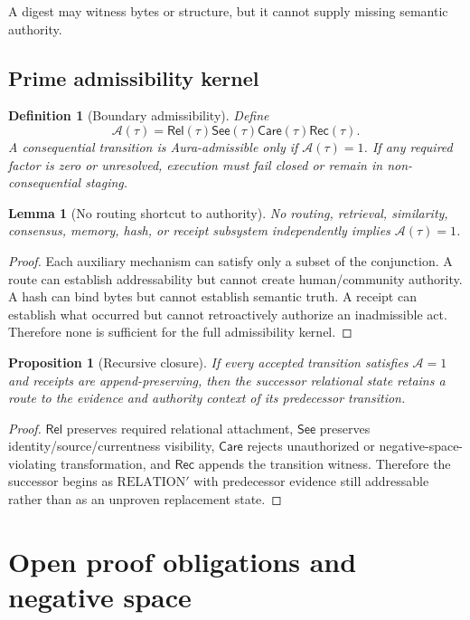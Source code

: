 \documentclass[11pt]{article}
\newtheorem{definition}{Definition}
\newtheorem{proposition}{Proposition}
\newtheorem{lemma}{Lemma}
\newcommand{\Rel}{\mathsf{Rel}}
\newcommand{\See}{\mathsf{See}}
\newcommand{\Care}{\mathsf{Care}}
\newcommand{\Rec}{\mathsf{Rec}}
\begin{document}
A digest may witness bytes or structure, but it cannot supply missing semantic authority.

\subsection{Prime admissibility kernel}

\begin{definition}[Boundary admissibility]
Define
\[
\mathcal{A}(\tau)=\Rel(\tau)\See(\tau)\Care(\tau)\Rec(\tau).
\]
A consequential transition is Aura-admissible only if \(\mathcal{A}(\tau)=1\). If any required factor is zero or unresolved, execution must fail closed or remain in non-consequential staging.
\end{definition}

\begin{lemma}[No routing shortcut to authority]
No routing, retrieval, similarity, consensus, memory, hash, or receipt subsystem independently implies \(\mathcal{A}(\tau)=1\).
\end{lemma}

\begin{proof}
Each auxiliary mechanism can satisfy only a subset of the conjunction. A route can establish addressability but cannot create human/community authority. A hash can bind bytes but cannot establish semantic truth. A receipt can establish what occurred but cannot retroactively authorize an inadmissible act. Therefore none is sufficient for the full admissibility kernel.
\end{proof}

\begin{proposition}[Recursive closure]
If every accepted transition satisfies \(\mathcal{A}=1\) and receipts are append-preserving, then the successor relational state retains a route to the evidence and authority context of its predecessor transition.
\end{proposition}

\begin{proof}
\(\Rel\) preserves required relational attachment, \(\See\) preserves identity/source/currentness visibility, \(\Care\) rejects unauthorized or negative-space-violating transformation, and \(\Rec\) appends the transition witness. Therefore the successor begins as \(\mathrm{RELATION}'\) with predecessor evidence still addressable rather than as an unproven replacement state.
\end{proof}

\section*{Open proof obligations and negative space}
\end{document}
